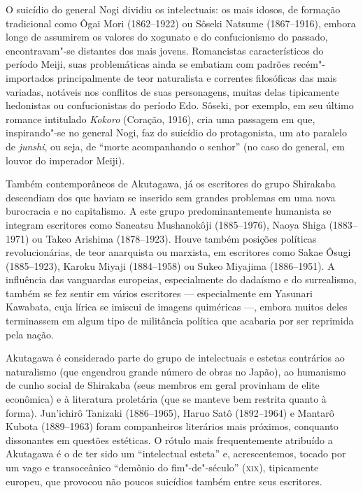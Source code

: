 O suicídio do general Nogi dividiu os intelectuais: os mais idosos, de
formação tradicional como Ôgai Mori (1862--1922) ou  Sôseki Natsume
(1867--1916), embora longe de assumirem os valores do xogunato e do
confucionismo do passado, encontravam"-se distantes dos mais jovens.
Romancistas característicos do período Meiji, suas problemáticas ainda
se embatiam com padrões recém"-importados principalmente de teor
naturalista e correntes filosóficas das mais variadas, notáveis nos
conflitos de suas personagens, muitas delas tipicamente hedonistas ou
confucionistas do período Edo. Sôseki, por exemplo, em seu último
romance intitulado \textit{Kokoro} (Coração, 1916), cria uma
passagem em que, inspirando"-se no general Nogi, faz do suicídio do
protagonista, um ato paralelo de \textit{junshi}, ou seja, de ``morte
acompanhando o senhor'' (no caso do general, em louvor do imperador Meiji).

Também contemporâneos de Akutagawa, já os escritores do grupo Shirakaba
descendiam dos que haviam se inserido sem grandes problemas em uma nova
burocracia e no capitalismo. A este grupo predominantemente humanista
se integram escritores como Saneatsu Mushanokôji (1885--1976), Naoya Shiga 
(1883--1971) ou Takeo Arishima (1878--1923). Houve também posições
políticas revolucionárias, de teor anarquista ou marxista, em
escritores como Sakae Ôsugi  (1885--1923), Karoku Miyaji (1884--1958) ou
Sukeo Miyajima  (1886--1951). A influência das vanguardas europeias,
especialmente do dadaísmo e do surrealismo, também se fez sentir em
vários escritores --- especialmente em Yasunari Kawabata, cuja lírica se
imiscui de imagens quiméricas ---, embora muitos deles terminassem em algum tipo
de militância política que acabaria por ser reprimida pela nação.

Akutagawa é considerado parte do grupo de intelectuais e estetas
contrários ao naturalismo (que engendrou grande número de obras no
Japão), ao humanismo de cunho social de Shirakaba (seus membros em
geral provinham de elite econômica) e à literatura proletária (que se
manteve bem restrita quanto à forma). Jun'ichirô Tanizaki  (1886--1965),
Haruo Satô  (1892--1964) e Mantarô Kubota  (1889--1963) foram companheiros
literários mais próximos, conquanto dissonantes em questões estéticas. O
rótulo mais frequentemente atribuído a Akutagawa é o de ter sido 
um ``intelectual esteta'' e, acrescentemos, tocado por um vago e transoceânico 
``demônio do fim"-de"-século'' (\textsc{xix}), tipicamente europeu, 
que provocou não poucos suicídios também entre seus escritores.

